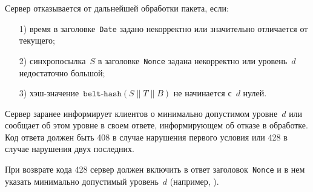 Сервер отказывается от дальнейшей обработки пакета, если:
\begin{enumerate}
\item[1)] 
время в заголовке~\texttt{Date} задано некорректно или значительно 
отличается от текущего;
\item[2)] 
синхропосылка~$S$ в заголовке~\texttt{Nonce} задана некорректно или 
уровень~$d$ недостаточно большой;
\item[3)] 
хэш-значение~$\texttt{belt-hash}(S\parallel T\parallel B)$ не начинается 
с~$d$ нулей.
\end{enumerate}

Сервер заранее информирует клиентов о минимально допустимом уровне~$d$
или сообщает об этом уровне в своем ответе, информирующем об отказе 
в обработке. Код ответа должен быть 408 в случае нарушения первого 
условия или 428 в случае нарушения двух последних.

При возврате кода 428 сервер должен включить в ответ 
заголовок~\texttt{Nonce} и в нем указать минимально допустимый 
уровень~$d$ (например, ).

